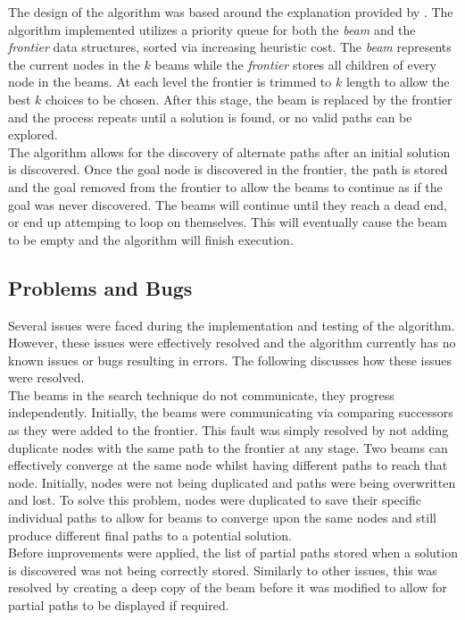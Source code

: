\documentclass[]{article}
\begin{document}
The design of the algorithm was based around the explanation provided by \cite{winston}. The algorithm implemented utilizes a priority queue for both the \textit{beam} and the \textit{frontier} data structures, sorted via increasing heuristic cost. The \textit{beam} represents the current nodes in the $k$ beams while the \textit{frontier} stores all children of every node in the beams. At each level the frontier is trimmed to $k$ length to allow the best $k$ choices to be chosen. After this stage, the beam is replaced by the frontier and the process repeats until a solution is found, or no valid paths can be explored. \\

The algorithm allows for the discovery of alternate paths after an initial solution is discovered. Once the goal node is discovered in the frontier, the path is stored and the goal removed from the frontier to allow the beams to continue as if the goal was never discovered. The beams will continue until they reach a dead end, or end up attemping to loop on themselves. This will eventually cause the beam to be empty and the algorithm will finish execution.

\subsection*{Problems and Bugs}

Several issues were faced during the implementation and testing of the algorithm. However, these issues were effectively resolved and the algorithm currently has no known issues or bugs resulting in errors. The following discusses how these issues were resolved.\\

The beams in the search technique do not communicate, they progress independently. Initially, the beams were communicating via comparing successors as they were added to the frontier. This fault was simply resolved by not adding duplicate nodes with the same path to the frontier at any stage. Two beams can effectively converge at the same node whilst having different paths to reach that node. Initially, nodes were not being duplicated and paths were being overwritten and lost. To solve this problem, nodes were duplicated to save their specific individual paths to allow for beams to converge upon the same nodes and still produce different final paths to a potential solution.\\

Before improvements were applied, the list of partial paths stored when a solution is discovered was not being correctly stored. Similarly to other issues, this was resolved by creating a deep copy of the beam before it was modified to allow for partial paths to be displayed if required.\\
\end{document}
